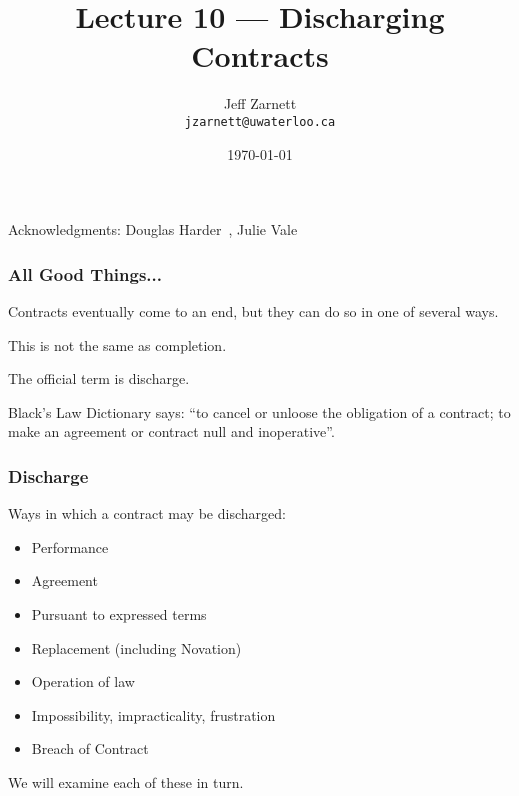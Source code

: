 

\title{Lecture 10 --- Discharging Contracts }

\author{Jeff Zarnett \\ \small \texttt{jzarnett@uwaterloo.ca}}
\date{\today}




\begin{frame}
  \titlepage

\begin{center}
  \small{Acknowledgments: Douglas Harder~\cite{dwh}, Julie Vale~\cite{jv}}
  \end{center}
\end{frame}




\begin{frame}
\frametitle{All Good Things...}

Contracts eventually come to an end, but they can do so in one of several ways.

This is not the same as completion.

The official term is \alert{discharge}.

Black's Law Dictionary says: ``to cancel or unloose the obligation of a contract; to make an agreement or contract null and inoperative''.

\end{frame}


\begin{frame}
\frametitle{Discharge}

Ways in which a contract may be discharged:

\begin{itemize}
	\item Performance
	\item Agreement
	\item Pursuant to expressed terms
	\item Replacement (including Novation)
	\item Operation of law
	\item Impossibility, impracticality, frustration
	\item Breach of Contract
\end{itemize}

We will examine each of these in turn.

\end{frame}



